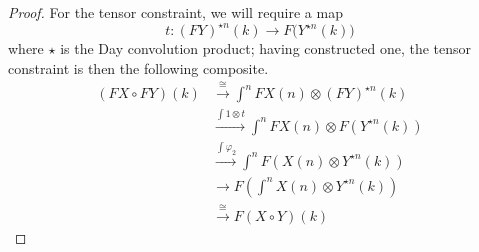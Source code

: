 \documentclass{amsbook} %
\numberwithin{section}{chapter}
\begin{document}
\begin{proof}
For the tensor constraint, we will require a map
\[
t \colon (FY)^{\star n}(k) \rightarrow F\big(Y^{\star n}(k)\big)
\]
 where $\star$ is the Day convolution product; having constructed one, the tensor constraint is then the following composite.
\begin{align*}
(FX \circ FY)(k)  &\xrightarrow{\cong} \int^{n} FX(n) \otimes (FY)^{\star n}(k) \\
&\xrightarrow{\int 1 \otimes t} \int^{n} FX(n) \otimes F(Y^{\star n}(k)) \\
&\xrightarrow{\int \varphi_2} \int^{n} F(X(n) \otimes Y^{\star n}(k)) \\
&\longrightarrow F \left(\int^{n} X(n) \otimes Y^{\star n}(k)\right) \\
&\xrightarrow{\cong} F(X \circ Y)(k)
\end{align*}


\end{proof}
\end{document}
